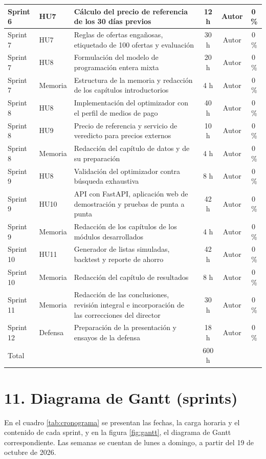 \documentclass[
11pt, %
]{charter}
\begin{document}
\begin{longtable}{@{}|p{1.3cm}|p{2.2cm}|p{6.2cm}|c|c|c|@{}}
Sprint 6 & HU7 & Cálculo del precio de referencia de los 30 días previos & 12 h & Autor & 0\,\% \\ \hline
Sprint 7 & HU7 & Reglas de ofertas engañosas, etiquetado de 100 ofertas y evaluación & 30 h & Autor & 0\,\% \\ \hline
Sprint 7 & HU8 & Formulación del modelo de programación entera mixta & 20 h & Autor & 0\,\% \\ \hline
Sprint 7 & Memoria & Estructura de la memoria y redacción de los capítulos introductorios & 4 h & Autor & 0\,\% \\ \hline
Sprint 8 & HU8 & Implementación del optimizador con el perfil de medios de pago & 40 h & Autor & 0\,\% \\ \hline
Sprint 8 & HU9 & Precio de referencia y servicio de veredicto para precios externos & 10 h & Autor & 0\,\% \\ \hline
Sprint 8 & Memoria & Redacción del capítulo de datos y de su preparación & 4 h & Autor & 0\,\% \\ \hline
Sprint 9 & HU8 & Validación del optimizador contra búsqueda exhaustiva & 8 h & Autor & 0\,\% \\ \hline
Sprint 9 & HU10 & API con FastAPI, aplicación web de demostración y pruebas de punta a punta & 42 h & Autor & 0\,\% \\ \hline
Sprint 9 & Memoria & Redacción de los capítulos de los módulos desarrollados & 4 h & Autor & 0\,\% \\ \hline
Sprint 10 & HU11 & Generador de listas simuladas, backtest y reporte de ahorro & 42 h & Autor & 0\,\% \\ \hline
Sprint 10 & Memoria & Redacción del capítulo de resultados & 8 h & Autor & 0\,\% \\ \hline
Sprint 11 & Memoria & Redacción de las conclusiones, revisión integral e incorporación de las correcciones del director & 30 h & Autor & 0\,\% \\ \hline
Sprint 12 & Defensa & Preparación de la presentación y ensayos de la defensa & 18 h & Autor & 0\,\% \\ \hline
\multicolumn{3}{|l|}{Total} & 600 h & & \\ \hline
\end{longtable}


\section{11. Diagrama de Gantt (sprints)}
\label{sec:gantt}

En el cuadro \ref{tab:cronograma} se presentan las fechas, la carga horaria y el contenido de cada sprint, y en la figura \ref{fig:gantt}, el diagrama de Gantt correspondiente. Las semanas se cuentan de lunes a domingo, a partir del 19 de octubre de 2026.
\end{document}
